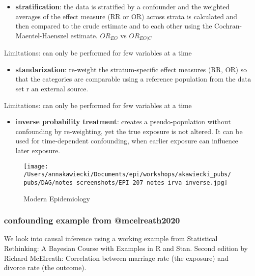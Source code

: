 \documentclass[
]{article}
\providecommand{\tightlist}{%
  \setlength{\itemsep}{0pt}\setlength{\parskip}{0pt}}
\begin{document}
\begin{itemize}
\tightlist
\item
  \textbf{stratification}: the data is stratified by a confounder and
  the weighted averages of the effect measure (RR or OR) across strata
  is calculated and then compared to the crude estimate and to each
  other using the Cochran-Maentel-Haenszel estimate. \(OR_{EO}\) vs
  \(OR_{EO|C}\)
\end{itemize}

Limitations: can only be performed for few variables at a time

\begin{itemize}
\tightlist
\item
  \textbf{standarization}: re-weight the stratum-specific effect
  measures (RR, OR) so that the categories are comparable using a
  reference population from the data set r an external source.
\end{itemize}

Limitations: can only be performed for few variables at a time

\begin{itemize}
\tightlist
\item
  \textbf{inverse probability treatment}: creates a pseudo-population
  without confounding by re-weighting, yet the true exposure is not
  altered. It can be used for time-dependent confounding, when earlier
  exposure can influence later exposure.
\end{itemize}

\begin{figure}
\centering
\texttt{[image: /Users/annakawiecki/Documents/epi/workshops/akawiecki\_pubs/pubs/DAG/notes screenshots/EPI 207 notes irva inverse.jpg]}
\caption{Modern Epidemiology}
\end{figure}

\hypertarget{confounding-example-from-mcelreath2020}{%
\subsubsection{confounding example from
@mcelreath2020}\label{confounding-example-from-mcelreath2020}}

We look into causal inference using a working example from Statistical
Rethinking: A Bayesian Course with Examples in R and Stan. Second
edition by Richard McElreath: Correlation between marriage rate (the
exposure) and divorce rate (the outcome).
\end{document}
